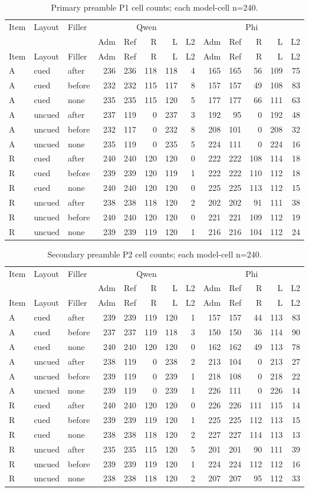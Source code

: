 \documentclass[11pt]{article}
\begin{document}
\begin{longtable}{lllrrrrrrrrrr}
\caption{Primary preamble P1 cell counts; each model-cell n=240.}\\
\toprule
Item&Layout&Filler&\multicolumn{5}{c}{Qwen}&\multicolumn{5}{c}{Phi}\\
&&&Adm&Ref&R&L&L2&Adm&Ref&R&L&L2\\\midrule\endfirsthead
\toprule Item&Layout&Filler&Adm&Ref&R&L&L2&Adm&Ref&R&L&L2\\\midrule\endhead
A&cued&after&236&236&118&118&4&165&165&56&109&75\\
A&cued&before&232&232&115&117&8&157&157&49&108&83\\
A&cued&none&235&235&115&120&5&177&177&66&111&63\\
A&uncued&after&237&119&0&237&3&192&95&0&192&48\\
A&uncued&before&232&117&0&232&8&208&101&0&208&32\\
A&uncued&none&235&119&0&235&5&224&111&0&224&16\\
R&cued&after&240&240&120&120&0&222&222&108&114&18\\
R&cued&before&239&239&120&119&1&222&222&110&112&18\\
R&cued&none&240&240&120&120&0&225&225&113&112&15\\
R&uncued&after&238&238&118&120&2&202&202&91&111&38\\
R&uncued&before&240&240&120&120&0&221&221&109&112&19\\
R&uncued&none&239&239&119&120&1&216&216&104&112&24\\
\bottomrule
\end{longtable}

\begin{longtable}{lllrrrrrrrrrr}
\caption{Secondary preamble P2 cell counts; each model-cell n=240.}\\
\toprule
Item&Layout&Filler&\multicolumn{5}{c}{Qwen}&\multicolumn{5}{c}{Phi}\\
&&&Adm&Ref&R&L&L2&Adm&Ref&R&L&L2\\\midrule\endfirsthead
\toprule Item&Layout&Filler&Adm&Ref&R&L&L2&Adm&Ref&R&L&L2\\\midrule\endhead
A&cued&after&239&239&119&120&1&157&157&44&113&83\\
A&cued&before&237&237&119&118&3&150&150&36&114&90\\
A&cued&none&240&240&120&120&0&162&162&49&113&78\\
A&uncued&after&238&119&0&238&2&213&104&0&213&27\\
A&uncued&before&239&119&0&239&1&218&108&0&218&22\\
A&uncued&none&239&119&0&239&1&226&111&0&226&14\\
R&cued&after&240&240&120&120&0&226&226&111&115&14\\
R&cued&before&239&239&119&120&1&225&225&112&113&15\\
R&cued&none&238&238&118&120&2&227&227&114&113&13\\
R&uncued&after&235&235&115&120&5&201&201&90&111&39\\
R&uncued&before&239&239&119&120&1&224&224&112&112&16\\
R&uncued&none&238&238&118&120&2&207&207&95&112&33\\
\bottomrule
\end{longtable}
\end{document}
